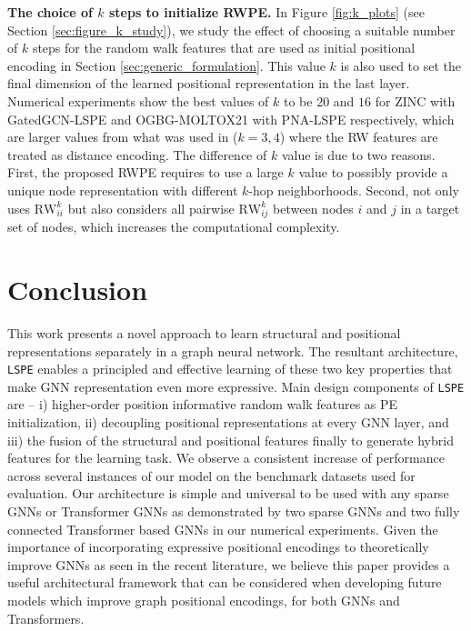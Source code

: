 \documentclass{article} \usepackage{iclr2021_conference,times}
\begin{document}
{\bf The choice of $k$ steps to initialize RWPE.}
\label{sec:experiments_ablation_k}
In Figure \ref{fig:k_plots} (see Section \ref{sec:figure_k_study}), we study the effect of choosing a suitable number of $k$ steps for the random walk features that are used as initial positional encoding in Section \ref{sec:generic_formulation}.
This value $k$ is also used to set the final dimension of the learned positional representation in the last layer. Numerical experiments show the best values of $k$ to be $20$ and $16$ for ZINC with GatedGCN-LSPE and OGBG-MOLTOX21 with PNA-LSPE respectively, which are larger values from what was used in \cite{li2020distance} ($k=3,4$) where the RW features are treated as distance encoding. The difference of $k$ value is due to two reasons. First, the proposed RWPE requires to use a large $k$ value to possibly provide a unique node representation with different $k$-hop neighborhoods. Second, \cite{li2020distance} not only uses $\text{RW}^k_{ii}$ but also considers all pairwise $\text{RW}^k_{ij}$ between nodes $i$ and $j$ in a target set of nodes, which increases the computational complexity. 





\section{Conclusion}
\label{sec:conclusion}
This work presents a novel approach to learn structural and positional representations separately in a graph neural network. The resultant architecture, \texttt{LSPE} enables a principled and effective learning of these two key properties that make GNN representation even more expressive. Main design components of \texttt{LSPE} are -- i) higher-order position informative random walk features as PE initialization, ii) decoupling positional representations at every GNN layer, and iii) the fusion of the structural and positional features finally to generate hybrid features for the learning task. We observe a consistent increase of performance across several instances of our model on the benchmark datasets used for evaluation. Our architecture is simple and universal to be used with any sparse GNNs or Transformer GNNs as demonstrated by two sparse GNNs and two fully connected Transformer based GNNs in our numerical experiments. Given the importance of incorporating expressive positional encodings to theoretically improve GNNs as seen in the recent literature, we believe this paper provides a useful architectural framework that can be considered when developing future models which improve graph positional encodings, for both GNNs and Transformers.
\end{document}
